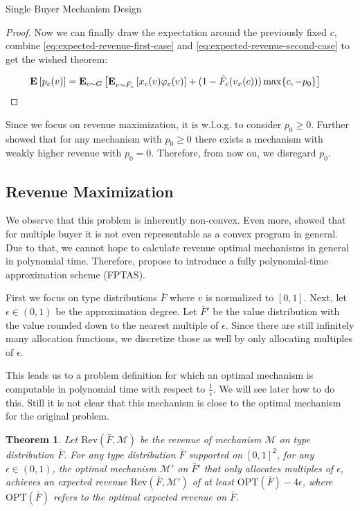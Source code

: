 \documentclass[11pt,a4paper]{article}
\newtheorem{theorem}{Theorem}
\newcommand{\Ex}[2][]{\mbox{\rm\bf E}_{#1}\left[#2\right]}
\newcommand{\1}[1]{\mbox{\rm\bf 1}_{#1}}
\begin{document}
\begin{section}{Single Buyer Mechanism Design}
\begin{proof}
     Now we can finally draw the expectation around the previously fixed $c$, combine \autoref{eq:expected-revenue-first-case} and \autoref{eq:expected-revenue-second-case} to get the wished theorem:

     \begin{align*}
         \Ex{p_c(v)} & = \Ex[c \sim G]{\Ex[v \sim \bar{F}_c]{x_c(v) \varphi_c(v)} + (1 - \bar{F}_{c}(v_x(c))) \max\{c, -p_0\} }
     \end{align*}
 \end{proof}

 Since we focus on revenue maximization, it is w.l.o.g. to consider $p_0 \geq 0$.
 Further \citet{primary} showed that for any mechanism with $p_0 \geq 0$ there exists a mechanism with weakly higher revenue with $p_0 = 0$.
 Therefore, from now on, we disregard $p_0$.

 \subsection{Revenue Maximization}
 \label{sec:revenue-maximization}

 We observe that this problem is inherently non-convex.
 Even more, \citet{primary} showed that for multiple buyer it is not even representable as a convex program in general.
 Due to that, we cannot hope to calculate revenue optimal mechanisms in general in polynomial time.
 Therefore, \citet{primary} propose to introduce a fully polynomial-time approximation scheme (FPTAS).

 First we focus on type distributions $\bar{F}$ where $v$ is normalized to $[0,1]$.
 Next, let $\epsilon \in (0, 1)$ be the approximation degree.
 Let $\bar{F}'$ be the value distribution with the value rounded down to the nearest multiple of $\epsilon$.
 Since there are still infinitely many allocation functions, we discretize those as well by only allocating multiples of $\epsilon$.

 This leads us to a problem definition for which an optimal mechanism is computable in polynomial time with respect to $\frac{1}{\epsilon}$.
 We will see later how to do this.
 Still it is not clear that this mechanism is close to the optimal mechanism for the original problem.

 \begin{theorem}
     \label{theorem:approximation-guarantee}
     Let $\mathrm{Rev}(\bar{F}, \mathcal{M})$ be the revenue of mechanism $\mathcal{M}$ on type distribution $\bar{F}$.
     For any type distribution $\bar{F}$ supported on $[0,1]^2$, for any $\epsilon \in (0,1)$,
     the optimal mechanism $\mathcal{M}'$ on $\bar{F}'$ that only allocates multiples of $\epsilon$, achieves an expected revenue $\mathrm{Rev}(\bar{F},\mathcal{M}')$ of at least
     $\mathrm{OPT}(\bar{F}) - 4\epsilon$, where $\mathrm{OPT}(\bar{F})$ refers to the optimal expected revenue on $\bar{F}$.
 \end{theorem}


\end{section}
\end{document}
